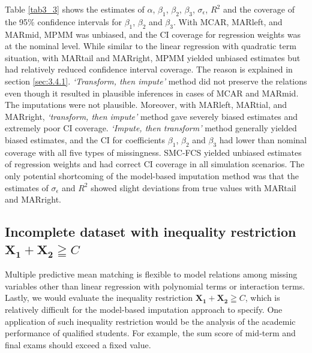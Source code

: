 	Table \ref{tab3_3} shows the estimates of $\alpha$, $\beta_1$, $\beta_2$, $\beta_3$, $\sigma_\epsilon$, $R^2$ and the coverage of the 95\% confidence intervals for $\beta_1$, $\beta_2$ and $\beta_3$. With MCAR, MARleft, and MARmid, MPMM was unbiased, and the CI coverage for regression weights was at the nominal level. While similar to the linear regression with quadratic term situation, with MARtail and MARright, MPMM yielded unbiased estimates but had relatively reduced confidence interval coverage. The reason is explained in section \ref{sec:3.4.1}. \emph{`Transform, then impute'} method did not preserve the relations even though it resulted in plausible inferences in cases of MCAR and MARmid. The imputations were not plausible. Moreover, with MARleft, MARtial, and MARright, \emph{`transform, then impute'} method gave severely biased estimates and extremely poor CI coverage. \emph{`Impute, then transform'} method generally yielded biased estimates, and the CI for coefficients $\beta_1$, $\beta_2$ and $\beta_3$ had lower than nominal coverage with all five types of missingness. SMC-FCS yielded unbiased estimates of regression weights and had correct CI coverage in all simulation scenarios. The only potential shortcoming of the model-based imputation method was that the estimates of $\sigma_\epsilon$ and $R^2$ showed slight deviations from true values with MARtail and MARright.  
	
	\subsection{Incomplete dataset with inequality restriction $\boldsymbol{X_1} + \boldsymbol{X_2} \geqq C$}
	\label{sec:3.4.3} 
	Multiple predictive mean matching is flexible to model relations among missing variables other than linear regression with polynomial terms or interaction terms. Lastly, we would evaluate the inequality restriction $\boldsymbol{X_1} + \boldsymbol{X_2} \geqq C$, which is relatively difficult for the model-based imputation approach to specify. One application of such inequality restriction would be the analysis of the academic performance of qualified students. For example, the sum score of mid-term and final exams should exceed a fixed value.  
	
